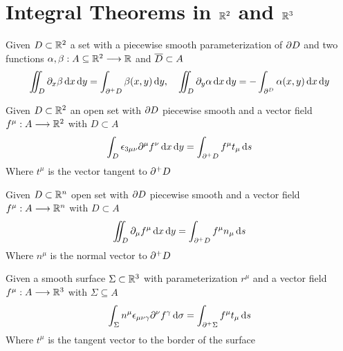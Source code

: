 \documentclass[../complete.tex]{subfiles}
\begin{document}
\section{Integral Theorems in $\mathbb{R}^2$ and $\mathbb{R}^3$}
\begin{thm}
	Given $D\subset\mathbb{R}^2$ a set with a piecewise smooth parameterization of $\partial D$ and two functions $\alpha,\beta:A\subseteq\mathbb{R}^2\overset{}{\longrightarrow}\mathbb{R}$ and $\overline{D}\subset A$
	\begin{equation}
		\iint_{D}^{}\partial_x\beta\operatorname{d\!} x\operatorname{d\!} y=\int_{\partial^+D}^{}\beta(x,y)\operatorname{d\!} y,\quad\iint_D\partial_y\alpha\operatorname{d\!} x\operatorname{d\!} y=-\int_{\partial^D}\alpha(x,y)\operatorname{d\!} x\operatorname{d\!} y
		\label{eq:gaussgreen1}
	\end{equation}
\end{thm}
\begin{thm}[Stokes]
	Given $D\subset\mathbb{R}^2$ an open set with $\partial D$ piecewise smooth and a vector field $f^\mu:A\overset{}{\longrightarrow}\mathbb{R}^2$ with $D\subset A$
	\begin{equation}
		\int_{D}^{}\epsilon_{3\mu\nu}\partial^\mu f^\nu\operatorname{d\!} x\operatorname{d\!} y=\int_{\partial^+D}f^\mu t_\mu\operatorname{d\!} s
		\label{eq:stokes}
	\end{equation}
	Where $t^\mu$ is the vector tangent to $\partial^+D$
\end{thm}
\begin{thm}[Gauss 1]
	Given $D\subset\mathbb{R}^n$ open set with $\partial D$ piecewise smooth and a vector field $f^\mu:A\overset{}{\longrightarrow}\mathbb{R}^n$ with $D\subset A$
	\begin{equation}
		\iint_D\partial_\mu f^\mu\operatorname{d\!} x\operatorname{d\!} y=\int_{\partial^+D}f^\mu n_\mu\operatorname{d\!} s
		\label{eq:gaussthm}
	\end{equation}
	Where $n^\mu$ is the normal vector to $\partial^+D$
\end{thm}
\begin{thm}
	Given a smooth surface $\Sigma\subset\mathbb{R}^3$ with parameterization $r^\mu$ and a vector field $f^\mu:A\overset{}{\longrightarrow}\mathbb{R}^3$ with $\Sigma\subseteq A$
	\begin{equation}
		\int_\Sigma n^\mu\epsilon_{\mu\nu\gamma}\partial^\nu f^\gamma\operatorname{d\!}\sigma=\int_{\partial^+\Sigma}f^\mu t_\mu\operatorname{d\!} s
		\label{eq:stokessurf}
	\end{equation}
	Where $t^\mu$ is the tangent vector to the border of the surface
\end{thm}
\end{document}
